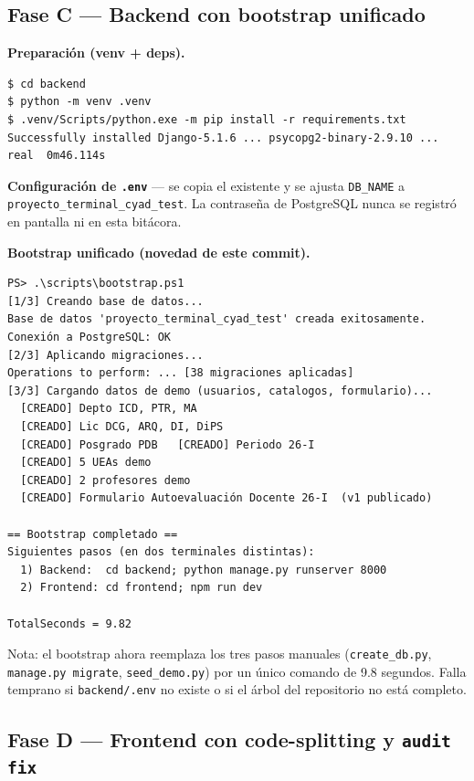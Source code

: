 \documentclass{computacion}
\begin{document}
\subsection{Fase C — Backend con bootstrap unificado}

\textbf{Preparación (venv + deps).}
\begin{Verbatim}[fontsize=\small, frame=single]
$ cd backend
$ python -m venv .venv
$ .venv/Scripts/python.exe -m pip install -r requirements.txt
Successfully installed Django-5.1.6 ... psycopg2-binary-2.9.10 ...
real  0m46.114s
\end{Verbatim}

\textbf{Configuración de \texttt{.env}} — se copia el existente y se ajusta \texttt{DB\_NAME} a \texttt{proyecto\_terminal\_cyad\_test}. La contraseña de PostgreSQL nunca se registró en pantalla ni en esta bitácora.

\textbf{Bootstrap unificado (novedad de este commit).}
\begin{Verbatim}[fontsize=\small, frame=single]
PS> .\scripts\bootstrap.ps1
[1/3] Creando base de datos...
Base de datos 'proyecto_terminal_cyad_test' creada exitosamente.
Conexión a PostgreSQL: OK
[2/3] Aplicando migraciones...
Operations to perform: ... [38 migraciones aplicadas]
[3/3] Cargando datos de demo (usuarios, catalogos, formulario)...
  [CREADO] Depto ICD, PTR, MA
  [CREADO] Lic DCG, ARQ, DI, DiPS
  [CREADO] Posgrado PDB   [CREADO] Periodo 26-I
  [CREADO] 5 UEAs demo
  [CREADO] 2 profesores demo
  [CREADO] Formulario Autoevaluación Docente 26-I  (v1 publicado)

== Bootstrap completado ==
Siguientes pasos (en dos terminales distintas):
  1) Backend:  cd backend; python manage.py runserver 8000
  2) Frontend: cd frontend; npm run dev

TotalSeconds = 9.82
\end{Verbatim}

Nota: el bootstrap ahora reemplaza los tres pasos manuales (\texttt{create\_db.py}, \texttt{manage.py migrate}, \texttt{seed\_demo.py}) por un único comando de 9.8 segundos. Falla temprano si \texttt{backend/.env} no existe o si el árbol del repositorio no está completo.

\subsection{Fase D — Frontend con code-splitting y \texttt{audit fix}}
\end{document}

